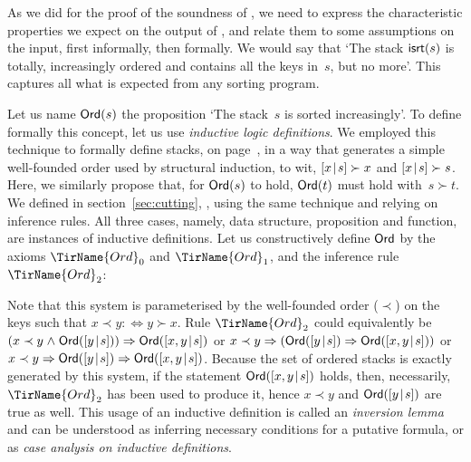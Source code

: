 As we did for the proof of the soundness of 
, we need to express the characteristic
properties we expect on the output of , and relate them to
some assumptions on the input, first informally, then formally. We
would say that `The stack \(\textsf{isrt}(s)\)
is totally, increasingly ordered and contains all the keys in~\(s\),
but no more'.  This captures all what is expected from any sorting
program.

Let us name \(\textsf{Ord}({s})\) the
proposition `The stack~\(s\) is sorted increasingly'. To define
formally this concept, let us use \emph{inductive logic
  definitions}. We employed this
technique to formally define stacks, on page~\pageref{def:stack}, in a
way that generates a simple well\hyp{}founded order used by structural
induction, to wit, \([{x}\!\mid\!{s}] \succ x\) and \([{x}\!\mid\!{s}] \succ
s\). Here, we similarly propose that, for \(\textsf{Ord}({s})\) to hold,
\(\textsf{Ord}({t})\) must hold with~\(s \succ t\). We defined 
in section~\ref{sec:cutting}, , using the same
technique and relying on inference rules. All three cases, namely,
data structure, proposition and function, are instances of inductive
definitions. Let us constructively define \(\textsf{Ord}\) by the
axioms \(\TirName{Ord}_0\) and \(\TirName{Ord}_1\), and the inference
rule \(\TirName{Ord}_2\):\label{def:Ord}
Note that this system is parameterised by the well\hyp{}founded order
(\(\prec\)) on the keys such that \(x \prec y :\Leftrightarrow y \succ
x\). Rule \(\TirName{Ord}_2\) could equivalently be \((x \prec y
\mathrel{\wedge} \textsf{Ord}({[{y}\!\mid\!{s}]})) \Rightarrow
\textsf{Ord}({[{x,y}\!\mid\!{s}]})\) or \(x \prec y \Rightarrow
(\textsf{Ord}({[{y}\!\mid\!{s}]}) \Rightarrow \textsf{Ord}({[{x,y}\!\mid\!{s}]}))\) or
\(x \prec y \Rightarrow \textsf{Ord}({[{y}\!\mid\!{s}]}) \Rightarrow
\textsf{Ord}({[{x,y}\!\mid\!{s}]})\). Because the set of ordered stacks is
exactly generated by this system, if the statement
\(\textsf{Ord}({[{x,y}\!\mid\!{s}]})\) holds, then, necessarily,
\(\TirName{Ord}_2\) has been used to produce it, hence \(x \prec y\)
and \(\textsf{Ord}({[{y}\!\mid\!{s}]})\) are true as well. This usage of an
inductive definition is called an \emph{inversion
  lemma} and can be understood as
inferring necessary conditions for a putative formula, or as
\emph{case analysis on inductive definitions}.


